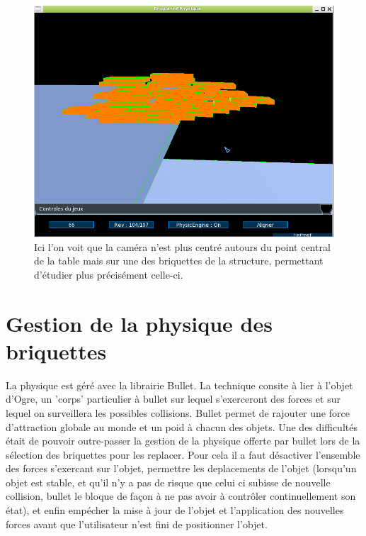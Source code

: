 \documentclass[frenchb,twoside]{EPURapport}
\begin{document}
    \begin{figure}[h]
		\centering
        \includegraphics[scale=0.75]{images/bon_score.png}
        \caption{\label{fig:bon_score}Ici l'on voit que la caméra n'est plus centré autours du point
        central de la table mais sur une des briquettes de la structure,
        permettant d'étudier plus précisément celle-ci.}
    \end{figure}

    \section{Gestion de la physique des briquettes}
        La physique est géré avec la librairie Bullet. La technique consite à
        lier à l'objet d'Ogre, un 'corps' particulier à bullet sur lequel
        s'exerceront des forces et sur lequel on surveillera les possibles
        collisions. Bullet permet de rajouter une force d'attraction globale au
        monde et un poid à chacun des objets. Une des difficultés était de
        pouvoir outre-passer la gestion de la physique offerte par bullet lors
        de la sélection des briquettes pour les replacer. Pour cela il a faut
        désactiver l'ensemble des forces s'exercant sur l'objet, permettre les
        deplacements de l'objet (lorsqu'un objet est stable, et qu'il n'y a pas
        de risque que celui ci subisse de nouvelle collision, bullet le bloque
        de façon à ne pas avoir à contrôler continuellement son état), et enfin
        empécher la mise à jour de l'objet et l'application des nouvelles
        forces avant que l'utilisateur n'est fini de positionner l'objet. 
\end{document}
